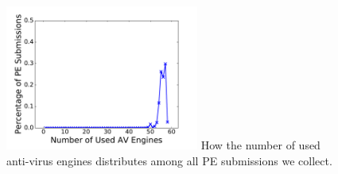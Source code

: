 \begin{figure}[t!]
\begin{center}
\includegraphics[width=2.5in]{figure/numVendor}
{
How the number of used anti-virus engines distributes among all PE submissions we collect.
}
\end{center}
\end{figure}
